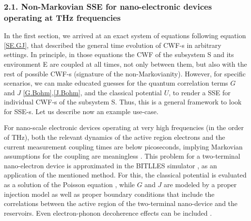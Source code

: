 \documentclass[11pt, a4paper]{article} %
\begin{document}
\subsubsection*{2.1. Non-Markovian SSE for nano-electronic devices operating at THz frequencies}\vspace{-0.15cm}
In the first section, we arrived at an exact system of equations following equation \eqref{SE.GJ}, that described the general time evolution of CWF-s in arbitrary settings. In principle, in those equations the CWF of the subsystem S and its environment E are coupled at all times, not only between them, but also with the rest of possible CWF-s (signature of the non-Markovianity). However, for specific scenarios, we can make educated guesses for the quantum correlation terms $G$ and $J$ \eqref{G.Bohm},\eqref{J.Bohm}, and the classical potential $U$, to render a SSE for individual CWF-s of the subsystem S. Thus, this is a general framework to look for SSE-s. Let us describe now an example use-case.

For nano-scale electronic devices operating at very high frequencies (in the order of THz), both the relevant dynamics of the active region electrons and the current measurement coupling times are below picoseconds, implying Markovian assumptions for the coupling are meaningless \cite{Thz}. This problem for a two-terminal nano-electron device is approximated in the BITLLES simulator \cite{tdp,Pois,Thz}, as an application of the mentioned method. For this, the classical potential is evaluated as a solution of the Poisson equation \cite{Pois}, while $G$ and $J$ are modeled by a proper injection model \cite{inject} as well as proper boundary conditions \cite{boundary1, boundary2} that include the correlations between the active region of the two-terminal nano-device and the reservoirs. Even electron-phonon decoherence effects can be included \cite{eph}.
\end{document}
